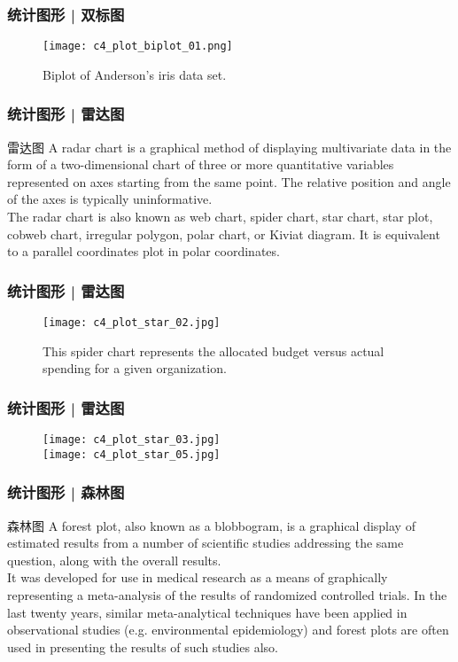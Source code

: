 \begin{frame}
  \frametitle{统计图形 | 双标图}
  \begin{figure}
    \centering
    \texttt{[image: c4\_plot\_biplot\_01.png]}
    \caption{Biplot of Anderson's iris data set.}
  \end{figure}
\end{frame}

\begin{frame}
  \frametitle{统计图形 | 雷达图}
  \begin{block}{雷达图}
    A radar chart is a graphical method of displaying multivariate data in the form of a two-dimensional chart of three or more quantitative variables represented on axes starting from the same point. The relative position and angle of the axes is typically uninformative.\\
    \vspace{0.5em}
The radar chart is also known as web chart, spider chart, star chart, star plot, cobweb chart, irregular polygon, polar chart, or Kiviat diagram. It is equivalent to a parallel coordinates plot in polar coordinates.
  \end{block}
\end{frame}

\begin{frame}
  \frametitle{统计图形 | 雷达图}
  \begin{figure}
    \centering
    \texttt{[image: c4\_plot\_star\_02.jpg]}
    \caption{This spider chart represents the allocated budget versus actual spending for a given organization.}
  \end{figure}
\end{frame}

\begin{frame}
  \frametitle{统计图形 | 雷达图}
  \begin{figure}
    \centering
    \texttt{[image: c4\_plot\_star\_03.jpg]}\\
    \texttt{[image: c4\_plot\_star\_05.jpg]}
  \end{figure}
\end{frame}

\begin{frame}
  \frametitle{统计图形 | 森林图}
  \begin{block}{森林图}
    A forest plot, also known as a blobbogram, is a graphical display of estimated results from a number of scientific studies addressing the same question, along with the overall results.\\
    \vspace{0.5em}
It was developed for use in medical research as a means of graphically representing a meta-analysis of the results of randomized controlled trials. In the last twenty years, similar meta-analytical techniques have been applied in observational studies (e.g. environmental epidemiology) and forest plots are often used in presenting the results of such studies also.
  \end{block}
\end{frame}

